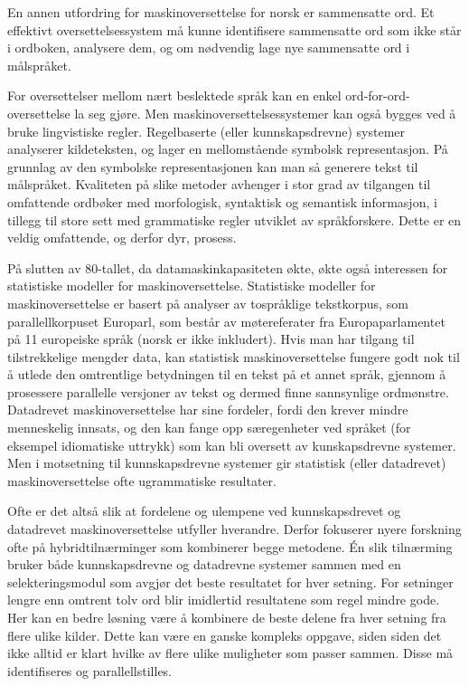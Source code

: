 \begin{multicols}{2}
En annen utfordring for maskinoversettelse for norsk er sammensatte ord. Et effektivt oversettelsessystem må kunne identifisere sammensatte ord som ikke står i ordboken, analysere dem, og om nødvendig lage nye sammensatte ord i målspråket.

For oversettelser mellom nært beslektede språk kan en enkel ord-for-ord-oversettelse la seg gjøre. Men maskinoversettelsessystemer kan også bygges ved å bruke lingvistiske regler. Regelbaserte (eller kunnskapsdrevne) systemer analyserer kildeteksten, og lager en mellomstående symbolsk representasjon. På grunnlag av den symbolske representasjonen kan man så generere tekst til målspråket. Kvaliteten på slike metoder avhenger i stor grad av tilgangen til omfattende ordbøker med morfologisk, syntaktisk og semantisk informasjon, i tillegg til store sett med grammatiske regler utviklet av  språkforskere. Dette er en veldig omfattende, og derfor dyr, prosess.

På slutten av 80-tallet, da datamaskinkapasiteten økte, økte også interessen for statistiske modeller for maskinoversettelse. Statistiske modeller for maskinoversettelse er basert på analyser av tospråklige tekstkorpus, som parallellkorpuset Europarl, som består av møtereferater fra Europaparlamentet på 11 europeiske språk 
(norsk er ikke inkludert).
Hvis man har tilgang til tilstrekkelige mengder data, kan statistisk maskinoversettelse fungere godt nok til å utlede den omtrentlige betydningen til en tekst på et annet språk, gjennom å prosessere parallelle versjoner av tekst og dermed finne sannsynlige ordmønstre. Datadrevet maskinoversettelse har sine fordeler, fordi den krever mindre menneskelig innsats, og den kan fange opp særegenheter ved språket (for eksempel idiomatiske uttrykk) som kan bli oversett av kunskapsdrevne systemer. Men i motsetning til kunnskapsdrevne systemer gir statistisk (eller datadrevet) maskinoversettelse ofte ugrammatiske resultater.  

Ofte er det altså slik at fordelene og ulempene ved kunnskapsdrevet og datadrevet maskinoversettelse utfyller hverandre. Derfor fokuserer nyere forskning ofte på hybridtilnærminger som kombinerer begge metodene. Én slik tilnærming bruker både kunnskapsdrevne og datadrevne systemer sammen med en selekteringsmodul som avgjør det beste resultatet for hver setning. For setninger lengre enn omtrent tolv ord blir imidlertid resultatene som regel mindre gode. Her kan en bedre løsning være å kombinere de beste delene fra hver setning fra flere ulike kilder. Dette kan være en ganske kompleks oppgave, siden siden det ikke alltid er klart hvilke av flere ulike muligheter som passer sammen. Disse må identifiseres og parallellstilles.   


\end{multicols}
